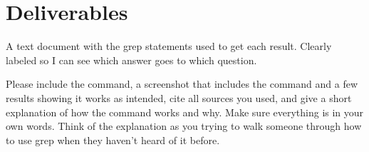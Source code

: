 \documentclass[12pt]{article}
\begin{document}
\section*{Deliverables}
A text document with the grep statements used to get each result.  Clearly labeled so I can see which answer goes to which question.


Please include the command, a screenshot that includes the command and a few results showing it works as intended, cite all sources you used, and give a short explanation of how the command works and why. Make sure everything is in your own words.  Think of the explanation as you trying to walk someone through how to use grep when they haven't heard of it before.
\end{document}
